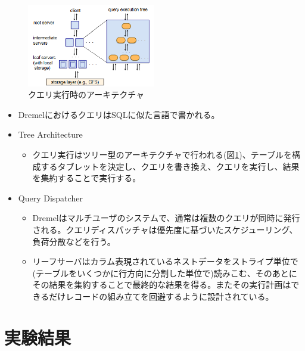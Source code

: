 \documentclass[dvipdfmx,uplatex]{jsarticle}
\theoremstyle{remark}
\newenvironment{method}[1]{
    \begin{tcolorbox}[
        colframe=green!50!black,
        colback=green!50!black!10!white,
        colbacktitle=green!50!black!40!white,
        coltitle=black,
        fonttitle=\bfseries,
        title={#1}
    ]
}{
    \end{tcolorbox}
}
\begin{document}

\begin{figure}
    \centering
    \includegraphics[width=0.5\textwidth]{img/dremel/execution.png}
    \caption{クエリ実行時のアーキテクチャ}
    \label{fig:query-execution}
\end{figure}

\begin{method}{クエリ実行}
\begin{itemize}
    \item DremelにおけるクエリはSQLに似た言語で書かれる。
    \item Tree Architecture
    \begin{itemize}
        \item クエリ実行はツリー型のアーキテクチャで行われる(図\ref{fig:query-execution})、テーブルを構成するタブレットを決定し、クエリを書き換え、クエリを実行し、結果を集約することで実行する。 
    \end{itemize}
    \item Query Dispatcher
    \begin{itemize}
        \item Dremelはマルチユーザのシステムで、通常は複数のクエリが同時に発行される。クエリディスパッチャは優先度に基づいたスケジューリング、負荷分散などを行う。
        \item リーフサーバはカラム表現されているネストデータをストライプ単位で(テーブルをいくつかに行方向に分割した単位で)読みこむ、そのあとにその結果を集約することで最終的な結果を得る。またその実行計画はできるだけレコードの組み立てを回避するように設計されている。
    \end{itemize}
\end{itemize}
\end{method}

\section{実験結果}
\end{document}
